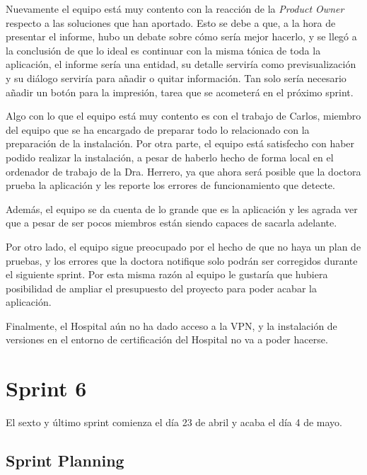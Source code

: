 Nuevamente el equipo está muy contento con la reacción de la \emph{Product Owner} respecto a las soluciones que han aportado. Esto se debe a que, a la hora de presentar el informe, hubo un debate sobre cómo sería mejor hacerlo, y se llegó a la conclusión de que lo ideal es continuar con la misma tónica de toda la aplicación, el informe sería una entidad, su detalle serviría como previsualización y su diálogo serviría para añadir o quitar información. Tan solo sería necesario añadir un botón para la impresión, tarea que se acometerá en el próximo sprint.

Algo con lo que el equipo está muy contento es con el trabajo de Carlos, miembro del equipo que se ha encargado de preparar todo lo relacionado con la preparación de la instalación. Por otra parte, el equipo está satisfecho con haber podido realizar la instalación, a pesar de haberlo hecho de forma local en el ordenador de trabajo de la Dra. Herrero, ya que ahora será posible que la doctora prueba la aplicación y les reporte los errores de funcionamiento que detecte.

Además, el equipo se da cuenta de lo grande que es la aplicación y les agrada ver que a pesar de ser pocos miembros están siendo capaces de sacarla adelante.

Por otro lado, el equipo sigue preocupado por el hecho de que no haya un plan de pruebas, y los errores que la doctora notifique solo podrán ser corregidos durante el siguiente sprint. Por esta misma razón al equipo le gustaría que hubiera posibilidad de ampliar el presupuesto del proyecto para poder acabar la aplicación.

Finalmente, el Hospital aún no ha dado acceso a la VPN, y la instalación de versiones en el entorno de certificación del Hospital no va a poder hacerse.


\section{Sprint 6}
\label{sec:sprint6}

El sexto y último sprint comienza el día 23 de abril y acaba el día 4 de mayo.

\subsection{Sprint Planning}
\label{subsec:S6-SP}

